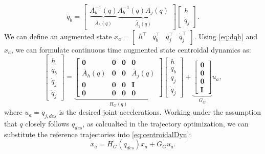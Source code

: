 \documentclass[conference]{IEEEtran}
\begin{document}
\begin{equation}
    \dot{q}_b = \begin{bmatrix}
        \underbrace{A_b^{-1}(q)}_{\widetilde{A_h}(q)} \underbrace{A_b^{-1}(q)A_j(q)}_{\widetilde{A_j}(q)}
    \end{bmatrix}
    \begin{bmatrix}
        h \\ \dot{q}_j
    \end{bmatrix}.
    \label{eq:dqh}
\end{equation}
We can define an augmented state $x_a = \begin{bmatrix}
    h^{\top} &  q_b^{\top} &q_j^{\top} & \dot{q}_j ^{\top}
\end{bmatrix}$. Using \eqref{eq:dqh} and $x_a$, we can formulate continuous time augmented state centroidal dynamics as:
\begin{equation}
    \begin{bmatrix}
        \dot{h} \\  \dot{q}_b \\ \dot{q}_j \\ \ddot{q}_j
    \end{bmatrix}
    =
    \underbrace{
    \begin{bmatrix}
        \mathbf{0} & \mathbf{0} & \mathbf{0} & \mathbf{0} \\
        \widetilde{A_h}(q) & \mathbf{0} & \mathbf{0} & \widetilde{A_j}(q) \\
        \mathbf{0} & \mathbf{0} & \mathbf{0} & \mathbf{I}\\
        \mathbf{0} & \mathbf{0} & \mathbf{0} & \mathbf{0}
    \end{bmatrix}
    }_{H_G(q)}
    \begin{bmatrix}
        h \\  q_b \\ q_j \\ \dot{q}_j
    \end{bmatrix}
    +
    \underbrace{
    \begin{bmatrix}
        \mathbf{0}\\
        \mathbf{0}\\
        \mathbf{0} \\
        \mathbf{I}
    \end{bmatrix}}_{G_G}
    u_a,
    \label{eq:centroidalDyn}
\end{equation}
where $u_a = \ddot{q}_{j, des}$ is the desired joint accelerations. Working under the assumption that $q$ closely follows $q_{des}$, as calcualted in the trajectory optimization, we can substitute the reference trajectories into \eqref{eq:centroidalDyn}:
\begin{equation}
    \dot{x}_a = H_G(q_{des}) x_a + G_G u_a.
    \label{eq:refDyn}
\end{equation}
\end{document}
